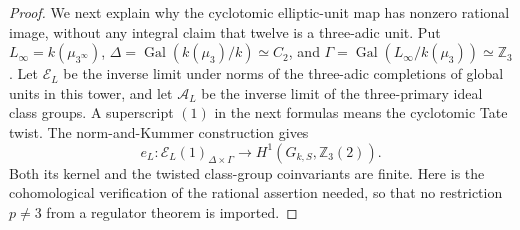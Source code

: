 \begin{proof}
We next explain why the cyclotomic elliptic-unit map
has nonzero rational image, without any integral
claim that twelve is a three-adic unit. Put
\(L_\infty=k(\mu_{3^\infty})\),
\(\Delta=\operatorname{Gal}(k(\mu_3)/k)\simeq C_2\),
and \(\Gamma=\operatorname{Gal}(L_\infty/k(\mu_3))\simeq\mathbb Z_3\).
Let \(\mathcal E_L\) be the inverse limit under norms
of the three-adic completions of global units in this
tower, and let \(\mathcal A_L\) be the inverse limit
of the three-primary ideal class groups. A superscript
\((1)\) in the next formulas means the cyclotomic
Tate twist. The norm-and-Kummer construction gives
\[
 e_L:\mathcal E_L(1)_{\Delta\times\Gamma}
              \longrightarrow H^1(G_{k,S},\mathbb Z_3(2)).
                                                               \tag{A.21.2}
\]
Both its kernel and the twisted class-group coinvariants
are finite. Here is the cohomological verification of
the rational assertion needed, so that no restriction
\(p\ne3\) from a regulator theorem is imported.


\end{proof}
